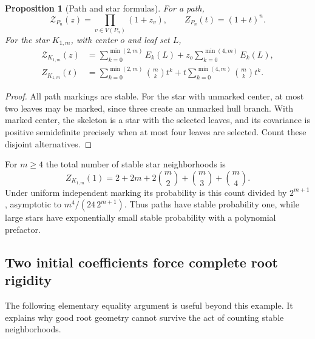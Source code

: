 \documentclass[11pt]{article}
\numberwithin{equation}{section}
\newtheorem{proposition}[theorem]{Proposition}
\theoremstyle{definition}
\newcommand{\Zpoly}{\mathcal Z}
\begin{document}
\begin{proposition}[Path and star formulas]\label{mts:prop:star}
For a path,
\begin{equation}
 \Zpoly_{P_n}(z)=\prod_{v\in V(P_n)}(1+z_v),
 \qquad Z_{P_n}(t)=(1+t)^n.
 \label{mts:eq:pathZ}
\end{equation}
For the star $K_{1,m}$, with center $o$ and leaf set $L$,
\begin{align}
 \Zpoly_{K_{1,m}}(z)
 &=\sum_{k=0}^{\min(2,m)}E_k(L)
       +z_o\sum_{k=0}^{\min(4,m)}E_k(L),\label{mts:eq:starZmulti}\\
 Z_{K_{1,m}}(t)
 &=\sum_{k=0}^{\min(2,m)}\binom mk t^k
       +t\sum_{k=0}^{\min(4,m)}\binom mk t^k.
 \label{mts:eq:starZ}
\end{align}
\end{proposition}
\begin{proof}
All path markings are stable. For the star with unmarked center, at most
two leaves may be marked, since three create an unmarked hull branch.
With marked center, the skeleton is a star with the selected leaves, and
its covariance is positive semidefinite precisely when at most four
leaves are selected. Count these disjoint alternatives.
\end{proof}

For $m\ge4$ the total number of stable star neighborhoods is
\begin{equation}
 Z_{K_{1,m}}(1)=2+2m+2\binom m2+\binom m3+\binom m4.
 \label{mts:eq:starcount}
\end{equation}
Under uniform independent marking its probability is this count divided
by $2^{m+1}$, asymptotic to $m^4/(24\,2^{m+1})$. Thus paths have stable
probability one, while large stars have exponentially small stable
probability with a polynomial prefactor.

\subsection{Two initial coefficients force complete root rigidity}

The following elementary equality argument is useful beyond this example.
It explains why good root geometry cannot survive the act of counting
stable neighborhoods.
\end{document}
